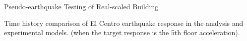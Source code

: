 \documentclass[usepdftitle=false]{beamer}
\begin{document}
\begin{frame}{Pseudo-earthquake Testing of Real-scaled Building}
\begin{figure}[!ht]
\centering
\setcounter{subfigure}{0}


\end{figure}
Time history comparison of El Centro earthquake response in the analysis and experimental models. (when the target response is the 5th floor acceleration).
\end{frame}
\end{document}
